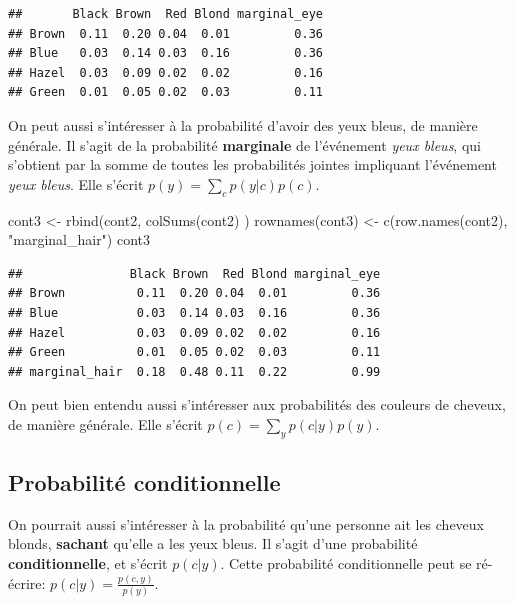 \documentclass[
  a4paper,11pt,twoside,onecolumn,openright,final,oldfontcommands]{memoir}
\newenvironment{Shaded}{\begin{snugshade}}{\end{snugshade}}
\newcommand{\FunctionTok}[1]{\textcolor[rgb]{0.00,0.00,0.00}{#1}}
\newcommand{\NormalTok}[1]{#1}
\newcommand{\OtherTok}[1]{\textcolor[rgb]{0.56,0.35,0.01}{#1}}
\newcommand{\StringTok}[1]{\textcolor[rgb]{0.31,0.60,0.02}{#1}}
\theoremstyle{definition}
\theoremstyle{definition}
\theoremstyle{definition}
\theoremstyle{definition}
\theoremstyle{remark}
\begin{document}
\begin{verbatim}
##       Black Brown  Red Blond marginal_eye
## Brown  0.11  0.20 0.04  0.01         0.36
## Blue   0.03  0.14 0.03  0.16         0.36
## Hazel  0.03  0.09 0.02  0.02         0.16
## Green  0.01  0.05 0.02  0.03         0.11
\end{verbatim}

On peut aussi s'intéresser à la probabilité d'avoir des yeux bleus, de manière générale. Il s'agit de la probabilité \textbf{marginale} de l'événement \emph{yeux bleus}, qui s'obtient par la somme de toutes les probabilités jointes impliquant l'événement \emph{yeux bleus}. Elle s'écrit \(p(y)=\sum\limits_{c}p(y|c)p(c)\).

\begin{Shaded}
\begin{Highlighting}[]
\NormalTok{cont3 }\OtherTok{\textless{}{-}} \FunctionTok{rbind}\NormalTok{(cont2, }\FunctionTok{colSums}\NormalTok{(cont2) )}
\FunctionTok{rownames}\NormalTok{(cont3) }\OtherTok{\textless{}{-}} \FunctionTok{c}\NormalTok{(}\FunctionTok{row.names}\NormalTok{(cont2), }\StringTok{"marginal\_hair"}\NormalTok{)}
\NormalTok{cont3}
\end{Highlighting}
\end{Shaded}

\begin{verbatim}
##               Black Brown  Red Blond marginal_eye
## Brown          0.11  0.20 0.04  0.01         0.36
## Blue           0.03  0.14 0.03  0.16         0.36
## Hazel          0.03  0.09 0.02  0.02         0.16
## Green          0.01  0.05 0.02  0.03         0.11
## marginal_hair  0.18  0.48 0.11  0.22         0.99
\end{verbatim}

On peut bien entendu aussi s'intéresser aux probabilités des couleurs de cheveux, de manière générale. Elle s'écrit \(p(c)=\sum\limits_{y}p(c|y)p(y)\).

\hypertarget{probabilituxe9-conditionnelle}{%
\subsection{Probabilité conditionnelle}\label{probabilituxe9-conditionnelle}}

On pourrait aussi s'intéresser à la probabilité qu'une personne ait les cheveux blonds, \textbf{sachant} qu'elle a les yeux bleus. Il s'agit d'une probabilité \textbf{conditionnelle}, et s'écrit \(p(c|y)\). Cette probabilité conditionnelle peut se ré-écrire: \(p(c|y)= \frac{p(c,y)}{p(y)}\).
\end{document}
